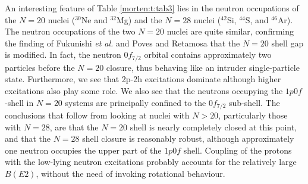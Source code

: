 An interesting feature of Table \ref{morten:t:tab3} lies in the neutron
occupations of the $N = 20$ nuclei ($^{30}$Ne and $^{32}$Mg) and the $N =
28$ nuclei ($^{42}$Si, $^{44}$S, and $^{46}$Ar).  The neutron
occupations of the two $N = 20$ nuclei are quite similar, confirming
the finding of Fukunishi {\it et al.} \cite{Morten:r:fukunishi} and Poves and
Retamosa \cite{Morten:r:poves1} that the $N= 20$ shell gap is modified.  In
fact, the neutron $0f_{7/2}$ orbital contains approximately two
particles before the $N=20$ closure, thus behaving like an intruder
single-particle state.  Furthermore, we see that 2p-2h excitations
dominate although higher excitations also play some role.  We also see
that the neutrons occupying the $1p0f$-shell in $N=20$ systems are
principally confined to the $0f_{7/2}$ sub-shell.
The conclusions that follow from looking at nuclei with $N > 20$,
particularly those with $N = 28$, are that the $N = 20$ shell is nearly
completely closed at this point, and that the $N=28$ shell closure is
reasonably robust, although approximately one neutron occupies the upper
part of the $1p0f$ shell. Coupling of the protons with the low-lying
neutron excitations probably accounts for the relatively large
$B(E2)$, without the need of invoking rotational behaviour.

